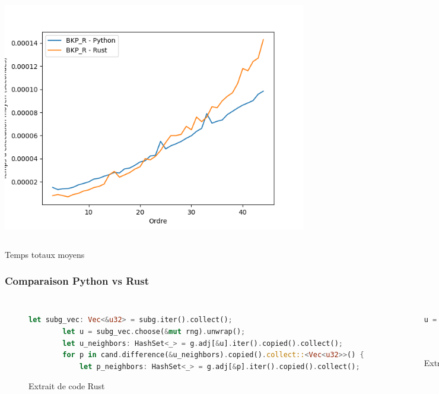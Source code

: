 \documentclass{beamer}
\begin{document}
\begin{frame}
\begin{columns}
    \includegraphics[width=\textwidth]{images/total_BKP_R_new_pyrust_pivot_complete_plot.png}
    \caption{Graphes complets}
  \end{columns}
  \begin{center}
    Temps totaux moyens
  \end{center}
\end{frame}

\begin{frame}[fragile]
  \frametitle{Comparaison Python vs Rust}
  \begin{columns}
  \begin{figure}[h]
  \begin{lstlisting}[language=Rust]
        let subg_vec: Vec<&u32> = subg.iter().collect();
        let u = subg_vec.choose(&mut rng).unwrap();
        let u_neighbors: HashSet<_> = g.adj[&u].iter().copied().collect();
        for p in cand.difference(&u_neighbors).copied().collect::<Vec<u32>>() {
            let p_neighbors: HashSet<_> = g.adj[&p].iter().copied().collect();
  \end{lstlisting}
  \caption{Extrait de code Rust}
  \end{figure}
  \begin{figure}[h]
  \begin{lstlisting}[language=Python]
        u = random.choice(list(SUBG))
        for p in CAND - G.adj[u]:
            p_neighbors = G.adj[p]
  \end{lstlisting}
  \caption{Extrait de code Python}
  \end{figure}
  \end{columns}
\end{frame}
\end{document}
